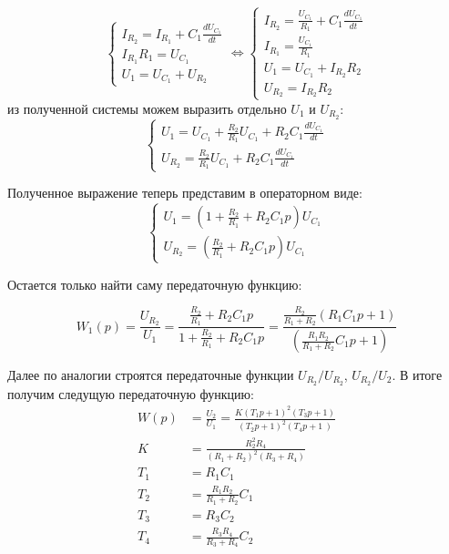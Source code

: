 \documentclass[russian, utf8]{eskdtext}
\begin{document}
\begin{equation*}
    \begin{cases}
        I_{R_2} = I_{R_1} + C_1\frac{dU_{C_1}}{dt} \\
        I_{R_1}R_1 = U_{C_1} \\
        U_1 = U_{C_1} + U_{R_2}
    \end{cases}
    \Leftrightarrow
    \begin{cases}
        I_{R_2} = \frac{U_{C_1}}{R_1} + C_1\frac{dU_{C_1}}{dt} \\
        I_{R_1} = \frac{U_{C_1}}{R_1} \\
        U_1 = U_{C_1} + I_{R_2}R_2 \\
        U_{R_2} = I_{R_2}R_2
    \end{cases}
\end{equation*}
из полученной системы можем выразить отдельно $U_1$ и $U_{R_2}$:
\begin{equation*}
    \begin{cases}
        U_1 = U_{C_1} + \frac{R_2}{R_1}U_{C_1} + R_2C_1\frac{dU_{C_1}}{dt} \\
        U_{R_2} = \frac{R_2}{R_1}U_{C_1} + R_2C_1\frac{dU_{C_1}}{dt}
    \end{cases}
\end{equation*} \par
Полученное выражение теперь представим в операторном виде:
\begin{equation*}
    \begin{cases}
        U_1 = \left( 1 + \frac{R_2}{R_1} + R_2C_1p \right) U_{C_1} \\
        U_{R_2} = \left( \frac{R_2}{R_1} + R_2C_1p \right) U_{C_1}
    \end{cases}
\end{equation*} \par

Остается только найти саму передаточную функцию: \par
\begin{equation}
    W_1(p) = \frac{U_{R_2}}{U_1} = \frac{\frac{R_2}{R_1} + R_2C_1p}{1 + \frac{R_2}{R_1} + R_2C_1p} = \frac{\frac{R_2}{R_1 + R_2}\left( R_1C_1p + 1 \right)}{\left( \frac{R_1R_2}{R_1 + R_2}C_1p + 1 \right)}
\end{equation}

Далее по аналогии строятся передаточные функции $U_{R_2}/U_{R_2}$, $U_{R_2}/U_2$. В итоге получим следущую передаточную функцию:
\begin{align}
    W(p) & = \frac{U_2}{U_1} = \frac{K\left(T_1p + 1 \right)^2 \left( T_3p + 1 \right)}{\left( T_2p + 1 \right)^2 \left( T_4p + 1 \ \right)} \\
    K & = \frac{R_2^2R_4}{(R_1 + R_2)^2(R_3 + R_4)} \\
    T_1 & = R_1C_1 \\
    T_2 & = \frac{R_1R_2}{R_1 + R_2}C_1 \\
    T_3 & = R_3C_2 \\
    T_4 & = \frac{R_3R_4}{R_3 + R_4}C_2
\end{align}
\end{document}
